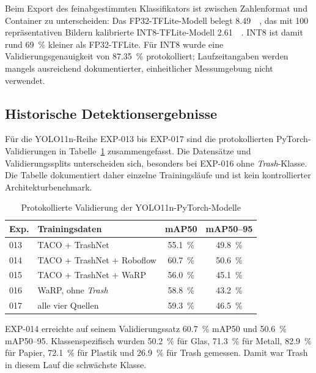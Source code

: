 Beim Export des feinabgestimmten Klassifikators ist zwischen Zahlenformat und Container zu unterscheiden: Das FP32-TFLite-Modell belegt \SI{8.49}{\mebi\byte}, das mit 100 repräsentativen Bildern kalibrierte INT8-TFLite-Modell \SI{2.61}{\mebi\byte}. INT8 ist damit rund \SI{69}{\percent} kleiner als FP32-TFLite. Für INT8 wurde eine Validierungsgenauigkeit von \SI{87.35}{\percent} protokolliert; Laufzeitangaben werden mangels ausreichend dokumentierter, einheitlicher Messumgebung nicht verwendet.

\subsection{Historische Detektionsergebnisse}
Für die YOLO11n-Reihe EXP-013 bis EXP-017 sind die protokollierten PyTorch-Validierungen in Tabelle~\ref{tab:yolo-results} zusammengefasst. Die Datensätze und Validierungssplits unterscheiden sich, besonders bei EXP-016 ohne \textit{Trash}-Klasse. Die Tabelle dokumentiert daher einzelne Trainingsläufe und ist kein kontrollierter Architekturbenchmark.

\begin{table}[h]
    \centering
    \caption{Protokollierte Validierung der YOLO11n-PyTorch-Modelle}
    \label{tab:yolo-results}
    \small
    \begin{tabular}{llcc}
        \toprule
        \textbf{Exp.} & \textbf{Trainingsdaten} & \textbf{mAP50} & \textbf{mAP50--95} \\
        \midrule
        013 & TACO + TrashNet & \SI{55.1}{\percent} & \SI{49.8}{\percent} \\
        014 & TACO + TrashNet + Roboflow & \SI{60.7}{\percent} & \SI{50.6}{\percent} \\
        015 & TACO + TrashNet + WaRP & \SI{56.0}{\percent} & \SI{45.1}{\percent} \\
        016 & WaRP, ohne \textit{Trash} & \SI{58.8}{\percent} & \SI{43.2}{\percent} \\
        017 & alle vier Quellen & \SI{59.3}{\percent} & \SI{46.5}{\percent} \\
        \bottomrule
    \end{tabular}
\end{table}

EXP-014 erreichte auf seinem Validierungssatz \SI{60.7}{\percent} mAP50 und \SI{50.6}{\percent} mAP50--95. Klassenspezifisch wurden \SI{50.2}{\percent} für Glas, \SI{71.3}{\percent} für Metall, \SI{82.9}{\percent} für Papier, \SI{72.1}{\percent} für Plastik und \SI{26.9}{\percent} für Trash gemessen. Damit war Trash in diesem Lauf die schwächste Klasse.

